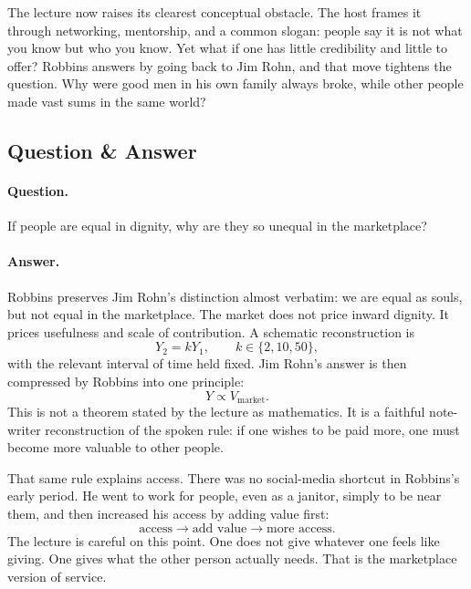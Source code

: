 The lecture now raises its clearest conceptual obstacle. The host frames it through networking, mentorship, and a common slogan: people say it is not what you know but who you know. Yet what if one has little credibility and little to offer? Robbins answers by going back to Jim Rohn, and that move tightens the question. Why were good men in his own family always broke, while other people made vast sums in the same world?

\subsection{Question \& Answer}

\paragraph{Question.} If people are equal in dignity, why are they so unequal in the marketplace?

\paragraph{Answer.} Robbins preserves Jim Rohn's distinction almost verbatim: we are equal as souls, but not equal in the marketplace. The market does not price inward dignity. It prices usefulness and scale of contribution. A schematic reconstruction is
\begin{equation}
Y_2 = kY_1,\qquad k\in\{2,10,50\},
\end{equation}
with the relevant interval of time held fixed. Jim Rohn's answer is then compressed by Robbins into one principle:
\begin{equation}
Y \propto V_{\text{market}}.
\end{equation}
This is not a theorem stated by the lecture as mathematics. It is a faithful note-writer reconstruction of the spoken rule: if one wishes to be paid more, one must become more valuable to other people.

That same rule explains access. There was no social-media shortcut in Robbins's early period. He went to work for people, even as a janitor, simply to be near them, and then increased his access by adding value first:
\begin{equation}
\text{access} \to \text{add value} \to \text{more access}.
\end{equation}
The lecture is careful on this point. One does not give whatever one feels like giving. One gives what the other person actually needs. That is the marketplace version of service.

